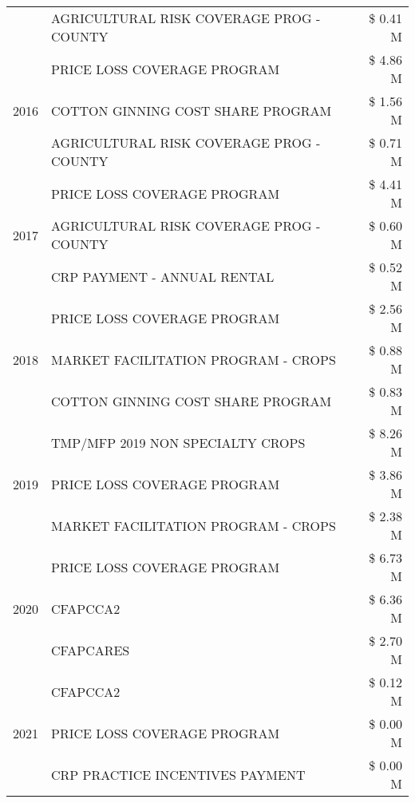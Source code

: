 \begin{tabular}{llr}
 & AGRICULTURAL RISK COVERAGE PROG - COUNTY & \$ 0.41 M \\
\cline{1-3}
\multirow[t]{3}{*}{2016} & PRICE LOSS COVERAGE PROGRAM                   & \$ 4.86 M \\
 & COTTON GINNING COST SHARE PROGRAM             & \$ 1.56 M \\
 & AGRICULTURAL RISK COVERAGE PROG - COUNTY      & \$ 0.71 M \\
\cline{1-3}
\multirow[t]{3}{*}{2017} & PRICE LOSS COVERAGE PROGRAM & \$ 4.41 M \\
 & AGRICULTURAL RISK COVERAGE PROG - COUNTY & \$ 0.60 M \\
 & CRP PAYMENT - ANNUAL RENTAL & \$ 0.52 M \\
\cline{1-3}
\multirow[t]{3}{*}{2018} & PRICE LOSS COVERAGE PROGRAM & \$ 2.56 M \\
 & MARKET FACILITATION PROGRAM - CROPS & \$ 0.88 M \\
 & COTTON GINNING COST SHARE PROGRAM & \$ 0.83 M \\
\cline{1-3}
\multirow[t]{3}{*}{2019} & TMP/MFP 2019 NON SPECIALTY CROPS & \$ 8.26 M \\
 & PRICE LOSS COVERAGE PROGRAM & \$ 3.86 M \\
 & MARKET FACILITATION PROGRAM - CROPS & \$ 2.38 M \\
\cline{1-3}
\multirow[t]{3}{*}{2020} & PRICE LOSS COVERAGE PROGRAM & \$ 6.73 M \\
 & CFAPCCA2 & \$ 6.36 M \\
 & CFAPCARES & \$ 2.70 M \\
\cline{1-3}
\multirow[t]{3}{*}{2021} & CFAPCCA2 & \$ 0.12 M \\
 & PRICE LOSS COVERAGE PROGRAM & \$ 0.00 M \\
 & CRP PRACTICE INCENTIVES PAYMENT & \$ 0.00 M \\
\cline{1-3}
\bottomrule
\end{tabular}
